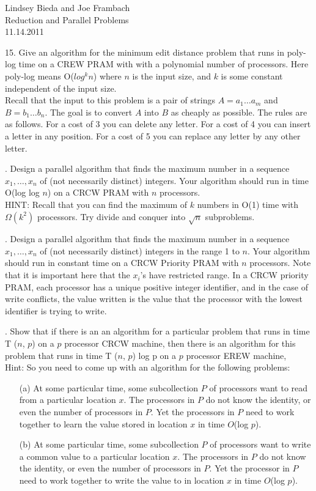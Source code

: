 \documentclass[10pt]{article}
\begin{document}
	\begin{flushright}
	Lindsey Bieda and Joe Frambach\\
	Reduction and Parallel Problems\\
	11.14.2011
	\end{flushright}

15. Give an algorithm for the minimum edit distance problem that runs in poly-log time on a CREW
PRAM with with a polynomial number of processors. Here poly-log means O($log^k n$) where $n$ is the
input size, and $k$ is some constant independent of the input size.\\
Recall that the input to this problem is a pair of strings $A = a_1 \ldots a_m$ and $B = b_1 \ldots b_n$. The goal is
to convert $A$ into $B$ as cheaply as possible. The rules are as follows. For a cost of 3 you can delete any
letter. For a cost of 4 you can insert a letter in any position. For a cost of 5 you can replace any letter
by any other letter.

. Design a parallel algorithm that finds the maximum number in a sequence $x_1, \ldots , x_n$ of (not necessarily
distinct) integers. Your algorithm should run in time O(log log $n$) on a CRCW PRAM with $n$ processors.\\
HINT: Recall that you can find the maximum of $k$ numbers in O(1) time with 
$\Omega(k^2)$ processors. Try divide and conquer into $\sqrt{n}$ subproblems.

. Design a parallel algorithm that finds the maximum number in a sequence $x_1, \ldots ,x_n$ of (not necessarily
distinct) integers in the range 1 to $n$. Your algorithm should run in constant time on a CRCW Priority
PRAM with $n$ processors. Note that it is important here that the $x_i$'s have restricted range. In a
CRCW priority PRAM, each processor has a unique positive integer identifier, and in the case of write
conflicts, the value written is the value that the processor with the lowest identifier is trying to write.

. Show that if there is an an algorithm for a particular problem that runs in time T ($n$, $p$) on a $p$
processor CRCW machine, then there is an algorithm for this problem that runs in time T ($n$, $p$) log p
on a $p$ processor EREW machine,\\
Hint: So you need to come up with an algorithm for the following problems:
\begin{enumerate}
	\item[(a)] At some particular time, some subcollection $P$ of processors want to read from a particular location
	$x$. The processors in $P$ do not know the identity, or even the number of processors in $P$. Yet the
	processors in $P$ need to work together to learn the value stored in location $x$ in time $O$(log $p$).
	\item[(b)] At some particular time, some subcollection $P$ of processors want to write a common value to
	a particular location $x$. The processors in $P$ do not know the identity, or even the number of
	processors in $P$. Yet the processor in $P$ need to work together to write the value to in location $x$
	in time $O$(log $p$).
\end{enumerate}
\end{document}
